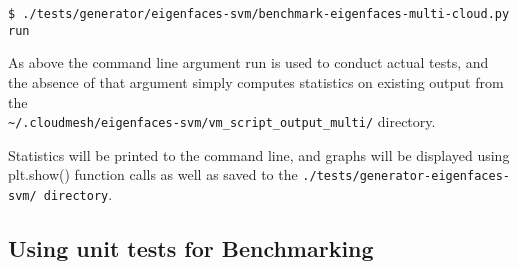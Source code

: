 \begin{verbatim}
$ ./tests/generator/eigenfaces-svm/benchmark-eigenfaces-multi-cloud.py run
\end{verbatim}

As above the command line argument run is used to conduct actual tests,
and the absence of that argument simply computes statistics on existing
output from the \\
\verb|~/.cloudmesh/eigenfaces-svm/vm_script_output_multi/|
directory.

Statistics will be printed to the command line, and graphs will be
displayed using plt.show() function calls as well as saved to the
\verb|./tests/generator-eigenfaces-svm/ directory|.

\subsection{Using unit tests for
Benchmarking}\label{a.4.-using-unit-tests-for-benchmarking}


